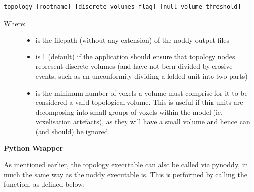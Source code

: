 \documentclass[a4paper,10pt,english]{sphinxmanual}
\begin{document}
\begin{Verbatim}[commandchars=\\\{\}]
topology [rootname] [discrete volumes flag] [null volume threshold]
\end{Verbatim}
\begin{description}
\item[{Where:}] \leavevmode\begin{itemize}
\item {} 
 is the filepath (without any extension) of the noddy output files

\item {} 
 is 1 (default) if the application should ensure that topology
nodes represent discrete volumes (and have not been divided by erosive events, such as an
unconformity dividing a folded unit into two parts)

\item {} 
 is the minimum number of voxels a volume must comprise for it to
be considered a valid topological volume. This is useful if thin units are decomposing into
small groups of voxels within the model (ie. voxelisation artefacts), as they will have a
small volume and hence can (and should) be ignored.

\end{itemize}

\end{description}

\textbf{Python Wrapper}

As mentioned earlier, the topology executable can also be called via pynoddy, in much the same
way as the noddy executable is. This is performed by calling the 
function, as defined below:
\end{document}
